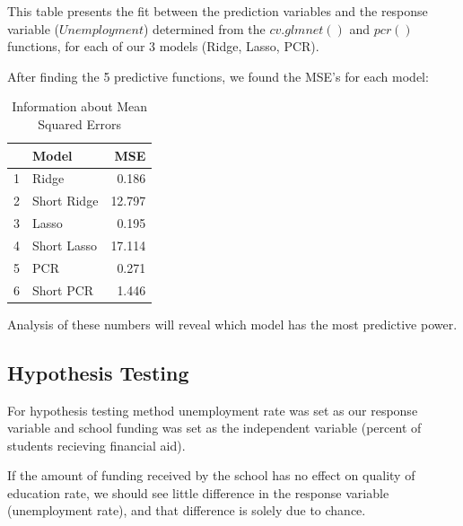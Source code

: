 \documentclass{article}
\begin{document}
This table presents the fit between the prediction variables and the response variable ($Unemployment$) determined from the $cv.glmnet()$ and $pcr()$ functions, for each of our 3 models (Ridge, Lasso, PCR).

After finding the 5 predictive functions, we found the MSE's for each model:

\begin{center}

\begin{table}[ht]
\centering
\caption{Information about Mean Squared Errors} 
\begin{tabular}{rlr}
  \hline
 & Model & MSE \\ 
  \hline
1 & Ridge & 0.186 \\ 
  2 & Short Ridge & 12.797 \\ 
  3 & Lasso & 0.195 \\ 
  4 & Short Lasso & 17.114 \\ 
  5 & PCR & 0.271 \\ 
  6 & Short PCR & 1.446 \\ 
   \hline
\end{tabular}
\end{table}
\end{center}


Analysis of these numbers will reveal which model has the most predictive power.

\subsection{Hypothesis Testing}

For hypothesis testing method unemployment rate was set as our response variable and school funding was set as the independent variable (percent of students recieving financial aid).

If the amount of funding received by the school has no effect on quality of education rate, we should see little difference in the response variable (unemployment rate), and that difference is solely due to chance.
\end{document}
